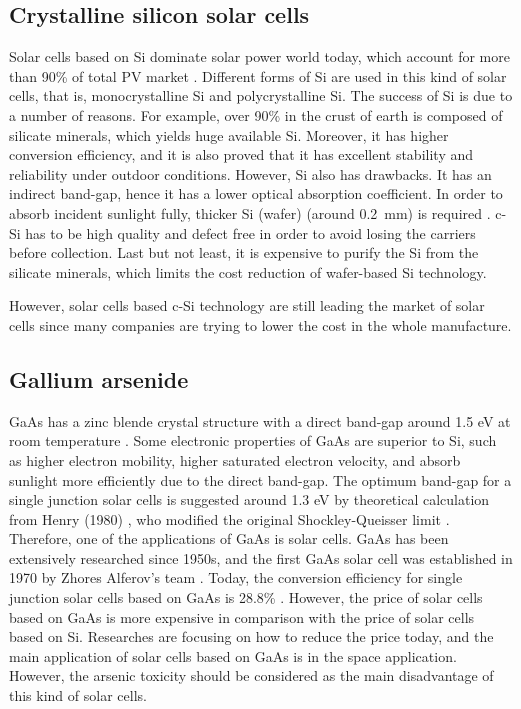 \documentclass[a4paper, 12pt, titlepage,oneside,drop]{kthesis}
\begin{document}
\subsection{Crystalline silicon solar cells}
Solar cells based on Si dominate solar power world today, which account for more than 90\% of total PV market \cite{hoffmann2006pv}.
Different forms of Si are used in this kind of solar cells, that is, monocrystalline Si and polycrystalline Si. 
The success of Si is due to a number of reasons. For example, over 90\% in the crust of earth is composed of silicate minerals, which yields huge available Si. Moreover, it has higher conversion efficiency, and it is also proved that 
it has excellent stability and reliability under outdoor conditions. However, Si also has drawbacks. It has an indirect band-gap, hence it has a lower optical absorption coefficient. In order to absorb incident sunlight fully, 
thicker Si (wafer) (around \SI{0.2} {\milli\meter}) is required \cite{brewer2013renewable}. c-Si has to be high quality and defect free in order to avoid losing the carriers before collection. Last but not least, it is expensive to purify the Si from the silicate minerals, which
limits the cost reduction of wafer-based Si technology. 

However, solar cells based c-Si technology are still leading the market of solar cells since many companies are trying to lower the cost in the whole manufacture.



\subsection{Gallium arsenide}
GaAs has a zinc blende crystal structure with a direct band-gap around 1.5 eV at room temperature \cite{cardona2005fundamentals, madelung2004semiconductors}. Some electronic properties of GaAs
are superior to Si, such as higher electron 
mobility, higher saturated electron velocity, and absorb sunlight more efficiently due to the direct band-gap. The optimum band-gap for a single junction solar cells is suggested around 1.3 eV by theoretical calculation 
from Henry (1980) \cite{henry1980limiting}, who modified the original Shockley-Queisser limit \cite{shockley1961detailed}. Therefore, one of the applications of GaAs is solar cells. GaAs has been extensively researched
since 1950s, and the first GaAs solar cell was established in
1970 by Zhores Alferov's team \cite{alferov2001nobel}. Today, the conversion efficiency for single junction solar cells based on GaAs is 28.8\% \cite{yablonovitch2012opto}. However, the
price of solar cells based on GaAs is more expensive in comparison with the price of solar cells based on Si.
Researches are focusing on how to reduce the price today, and the main application of solar cells based on GaAs is in the space application. However, the arsenic toxicity should be considered as the main disadvantage of this kind of 
solar cells. 
\end{document}
